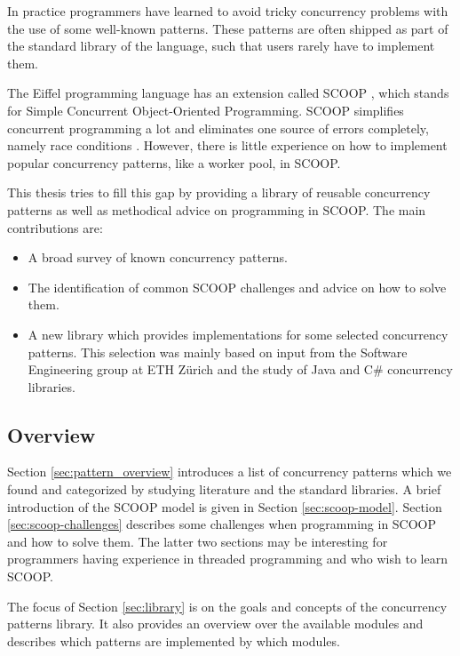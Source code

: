 \documentclass[a4paper,10pt,titlepage]{article}
\begin{document}
In practice programmers have learned to avoid tricky concurrency problems with the use of some well-known patterns.
These patterns are often shipped as part of the standard library of the language, such that users rarely have to implement them.

The Eiffel programming language \cite{web:ecma-eiffel}\cite{book:touchofclass} has an extension called SCOOP \cite{Nienaltowski07}\cite{web:scoop},
which stands for Simple Concurrent Object-Oriented Programming.
SCOOP simplifies concurrent programming a lot and eliminates one source of errors completely, namely race conditions \cite{Nienaltowski07}.
However, there is little experience on how to implement popular concurrency patterns, like a worker pool, in SCOOP.

This thesis tries to fill this gap by providing a library of reusable concurrency patterns as well as methodical advice on programming in SCOOP.
The main contributions are:
\begin{itemize}
 \item A broad survey of known concurrency patterns.
 \item The identification of common SCOOP challenges and advice on how to solve them.
 \item A new library which provides implementations for some selected concurrency patterns.
 This selection was mainly based on input from the Software Engineering group at ETH Zürich and the study of Java \cite{web:java-concurrency} and C\# \cite{web:ms-tpl} concurrency libraries.
\end{itemize}

\subsection{Overview}

Section \ref{sec:pattern_overview} introduces a list of concurrency patterns which we found and categorized by studying literature and the standard libraries.
A brief introduction of the SCOOP model is given in Section \ref{sec:scoop-model}.
Section \ref{sec:scoop-challenges} describes some challenges when programming in SCOOP and how to solve them.
The latter two sections may be interesting for programmers having experience in threaded programming and who wish to learn SCOOP.

The focus of Section \ref{sec:library} is on the goals and concepts of the concurrency patterns library.
It also provides an overview over the available modules and describes which patterns are implemented by which modules.
\end{document}
